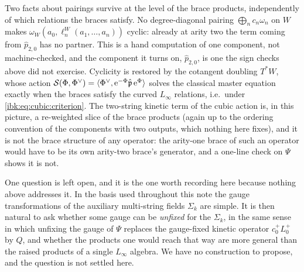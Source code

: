 Two facts about pairings survive at the level of the brace products, independently of which relations the braces satisfy. No degree-diagonal pairing $\bigoplus_nc_n\omega_n$ on $W$ makes $\omega_W(a_0,\ell^W_n(a_1,\dots,a_n))$ cyclic: already at arity two the term coming from $\hat p_{2,0}$ has no partner. This is a hand computation of one component, not machine-checked, and the component it turns on, $\hat p_{2,0}$, is one the sign checks above did not exercise. Cyclicity is restored by the cotangent doubling $T^*W$, whose action ${\mathcal{S}}(\Phi,\Phi^\vee)=\langle\Phi^\vee,\mathrm{e}^{-\Phi}\hat{\mathfrak p}\,\mathrm{e}^{\Phi}\rangle$ solves the classical master equation exactly when the braces satisfy the curved $L_\infty$ relations, i.e.\ under \eqref{ibk:eq:cubic:criterion}. The two-string kinetic term of the cubic action is, in this picture, a re-weighted slice of the brace products (again up to the ordering convention of the components with two outputs, which nothing here fixes), and it is not the brace structure of any operator: the arity-one brace of such an operator would have to be its own arity-two brace's generator, and a one-line check on $\Psi$ shows it is not.

One question is left open, and it is the one worth recording here because nothing above addresses it. In the basis used throughout this note the gauge transformations of the auxiliary multi-string fields $\Sigma_k$ are simple. It is then natural to ask whether some gauge can be \emph{unfixed} for the $\Sigma_k$, in the same sense in which unfixing the gauge of $\Psi$ replaces the gauge-fixed kinetic operator $c_0^+L_0^+$ by $Q$, and whether the products one would reach that way are more general than the raised products of a single $L_\infty$ algebra. We have no construction to propose, and the question is not settled here.

